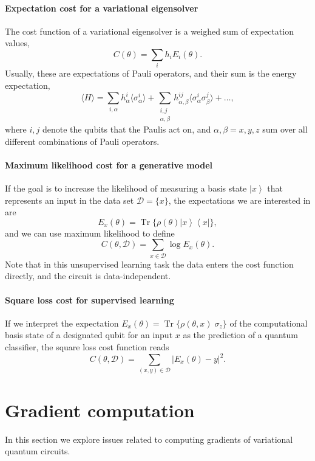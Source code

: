 \documentclass[aps,pra,10pt,twocolumn,groupedaddress,nofootinbib]{revtex4-1}
\theoremstyle{plain}
\DeclareMathOperator{\tr}{Tr}
\newcommand{\be}{\begin{equation}}
\newcommand{\ee}{\end{equation}}
\newcommand{\ket}[1]{\ensuremath{\left| #1 \right \rangle}}
\newcommand{\bra}[1]{\ensuremath{\left \langle #1 \right |}}
\newcommand{\ketbra}[2]{\ket{#1}\bra{#2}}
\begin{document}
\paragraph{Expectation cost for a variational eigensolver}

The cost function of a variational eigensolver is a weighed sum of expectation values,
\[ C(\theta) = \sum_i h_i E_i(\theta). \]
Usually, these are expectations of Pauli operators, and their sum is the energy expectation,
\[\langle H \rangle = \sum\limits_{i, \alpha} h^i_{\alpha} \langle\sigma^i_{\alpha}\rangle + \sum\limits_{\substack{i,j\\ \alpha, \beta}} h^{ij}_{\alpha, \beta} \langle \sigma^i_{\alpha}\sigma^j_{\beta}\rangle + \hdots,\]
where $i,j$ denote the qubits that the Paulis act on, and
$\alpha, \beta = x,y,z$ sum over all different combinations of Pauli operators.

\paragraph{Maximum likelihood cost for a generative model}
If the goal is to increase the likelihood of measuring a basis state
$\ket{x}$ that represents an input in the data set
$\mathcal{D} = \{x\}$, the expectations we are interested in are
\be
E_x(\theta) =  \tr\{\rho(\theta) \ketbra{x}{x}  \},
\ee
and we can use maximum likelihood to define
\[C(\theta, \mathcal{D}) = \sum_{x \in \mathcal{D}}\log E_x(\theta) .\]
Note that in this unsupervised learning task the data enters the cost function directly, and the circuit is data-independent.


\paragraph{Square loss cost for supervised learning}
If we interpret the expectation $E_x(\theta) = \tr \{ \rho(\theta, x)
\; \sigma_z \}$ of the computational basis state of a designated qubit
for an input $x$ as the prediction of a quantum classifier, the square
loss cost function reads
\[ C(\theta, \mathcal{D}) = \sum_{(x,y) \in \mathcal{D}} |E_x(\theta)-y|^2. \]

\color{black}


\section{Gradient computation}

In this section we explore issues related to computing gradients of variational quantum circuits.
\end{document}
